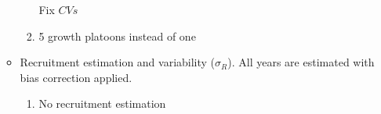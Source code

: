 \documentclass[11pt,
  english,
  a4paper,
]{article}
\begin{document}
\begin{itemize}
\begin{itemize}
\begin{enumerate}
      Fix {\(CVs\)\leavevmode\tagmcend\tagstructend}

      \tagmcend\tagstructend\tagstructend

      \tagmcend\tagstructend\tagstructend

      \tagmcend\tagstructend\tagstructend
    \item



      5 growth platoons instead of one

      \tagmcend\tagstructend\tagstructend

      \tagmcend\tagstructend\tagstructend

      \tagmcend\tagstructend\tagstructend
    \end{enumerate}

    \tagstructend
  \item


    Recruitment estimation and variability ({\(\sigma_R\)\leavevmode\tagmcend\tagstructend}). All years are estimated with bias correction applied.

    \tagmcend\tagstructend\tagstructend

    \tagmcend\tagstructend\tagstructend


    \begin{enumerate}
    \def\labelenumi{\arabic{enumi}.}
    \setcounter{enumi}{12}
    \item



      No recruitment estimation

      \tagmcend\tagstructend\tagstructend

      \tagmcend\tagstructend\tagstructend


\end{enumerate}
\end{itemize}
\end{itemize}
\end{document}
